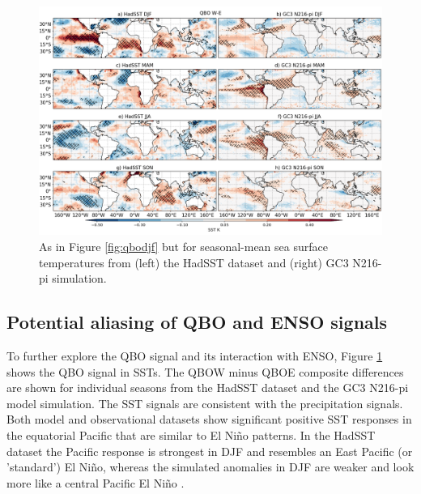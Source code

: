 \begin{figure}[t!]
\centering
 \includegraphics[width=\linewidth]{figures/papersstqbowqboe.png}
\caption[Annual mean SST difference QBO W-E under different QBO phases.]{ As in Figure \ref{fig:qbodjf} but for seasonal-mean sea surface temperatures from (left) the HadSST dataset and (right) GC3 N216-pi simulation.}
\label{fig:sstclim}
\end{figure}

\subsection{Potential aliasing of QBO and ENSO signals} \label{qbo7_enso}

To further explore the QBO signal and its interaction with ENSO, Figure \ref{fig:sstclim} shows the QBO signal in SSTs. The QBOW minus QBOE composite differences are shown for individual seasons from the HadSST dataset and the GC3 N216-pi model simulation. The SST signals are consistent with the precipitation signals. Both model and observational datasets show significant positive SST responses in the equatorial Pacific that are similar to El Niño patterns. In the HadSST dataset the Pacific response is strongest in DJF and resembles an East Pacific (or ’standard’) El Niño, whereas the simulated anomalies in DJF are weaker and look more like a central Pacific El Niño \citep{capotondi2015}. 

